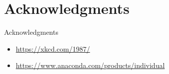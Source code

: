 \documentclass[t,handout,9pt]{beamer}
\begin{document}
\section{Acknowledgments}
\begin{frame}{Acknowledgments}
\begin{itemize}
	\item \url{https://xkcd.com/1987/}
	\item \url{https://www.anaconda.com/products/individual}
\end{itemize}
\end{frame}
%

\end{document}
